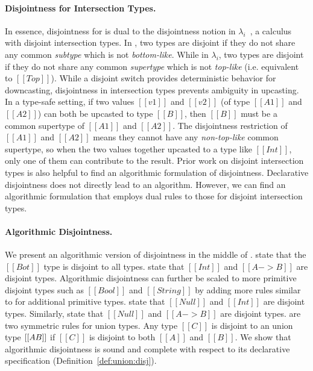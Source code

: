 
\paragraph*{Disjointness for Intersection Types.}
In essence, disjointness for \name is dual to the disjointness
notion in $\lambda_i$~\citep{oliveira2016disjoint}, a calculus with
disjoint intersection types.
In \name, two types are disjoint if they do not share any common
\emph{subtype} which is not \emph{bottom-like}.
While in $\lambda_i$, two types are disjoint if they do not share any
common \emph{supertype} which is not \emph{top-like}  (i.e. equivalent
to $[[Top]]$). While a disjoint switch
provides deterministic behavior for downcasting, disjointness in
intersection types prevents ambiguity in upcasting. In a type-safe
setting, if two values $[[v1]]$ and $[[v2]]$ (of type $[[A1]]$ and
$[[A2]]$) can both be upcasted to type $[[B]]$, then $[[B]]$ must be a common
supertype of $[[A1]]$ and $[[A2]]$.  The disjointness restriction of
$[[A1]]$ and $[[A2]]$ means they cannot have any \emph{non-top-like} common
supertype, so when the two values together upcasted to a type like
$[[Int]]$, only one of them can contribute to the result.
Prior work on disjoint intersection types is also helpful to find an
algorithmic formulation of disjointness.
Declarative disjointness does not directly lead to an algorithm.
However, we can find an algorithmic formulation that employs
dual rules to those for disjoint intersection types.

\paragraph*{Algorithmic Disjointness.}
We present an algorithmic version of disjointness in
the middle of .
 state that the $[[Bot]]$
type is disjoint to all types.   state that
$[[Int]]$ and $[[A -> B]]$ are disjoint types.  Algorithmic
disjointness can further be scaled to more primitive disjoint types
such as $[[Bool]]$ and $[[String]]$ by adding more rules similar to
 for additional primitive types.
 state that
$[[Null]]$ and $[[Int]]$ are disjoint types.
Similarly,  state that
$[[Null]]$ and $[[A -> B]]$ are disjoint types.
 are two symmetric rules for union types. Any type $[[C]]$ is
disjoint to an union type $[[A \/ B]]$ if $[[C]]$ is disjoint to both
$[[A]]$ and $[[B]]$.
We show that algorithmic disjointness is sound and complete
with respect to its declarative specification (Definition~\ref{def:union:disj}).

